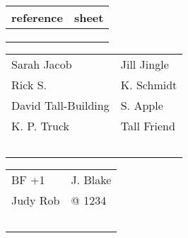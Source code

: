\documentclass{article}
\begin{document}
\centering
\calligra

    
﻿
\begin{adjustbox}{width=\pagewidth}
\begin{tabular}{C{2.5cm} | C{2.5cm} }
\hline
reference  & sheet \\ 
\hline
&  \\
\hline
& \\
\hline
& 
\end{tabular}
\end{adjustbox}



\begin{adjustbox}{width=\pagewidth}
\begin{tabular}{C{2.5cm}C{2.5cm} |}

		Sarah Jacob &  Jill Jingle \\ 
		Rick S. &  K. Schmidt \\ 
		David Tall-Building &  S. Apple \\ 
		K. P. Truck &  Tall Friend \\ 


﻿\end{tabular}
\end{adjustbox}
\newpage



\begin{adjustbox}{width=\pagewidth}
\begin{tabular}{C{2.5cm}C{2.5cm} |}

		BF +1 &  J. Blake \\ 
		Judy Rob &   @ 1234 \\ 


﻿\end{tabular}
\end{adjustbox}
\newpage

﻿
\end{document}
